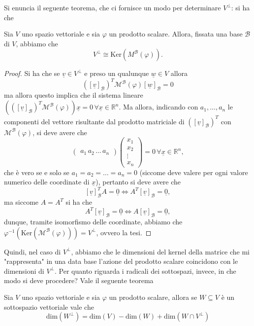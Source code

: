 Si enuncia il seguente teorema, che ci fornisce un modo per determinare $V^\perp$: si ha che
\begin{theorem} \label{thm:rad_V}
	Sia $V$ uno spazio vettoriale e sia $\varphi$ un prodotto scalare. Allora, fissata una base $\mathcal{B}$ di $V$, abbiamo che
	$$
		V^\perp \cong \text{Ker}(M^\mathcal{B}(\varphi)).
	$$
\end{theorem}
\begin{proof}
	Si ha che se $\underline{v} \in V^\perp$ e preso un qualunque $\underline{w} \in V$ allora
	$$
		([\underline{v}]_\mathcal{B})^T \mathcal{M}^\mathcal{B}(\varphi) [\underline{w}]_\mathcal{B} = 0
	$$
	ma allora questo implica che il sistema lineare $(([\underline{v}]_\mathcal{B})^T \mathcal{M}^\mathcal{B}(\varphi))\underline{x} = 0 \, \forall \underline{x} \in \mathbb{R}^n$. Ma allora, indicando con $a_1, \ldots, a_n$ le componenti del vettore risultante dal prodotto matriciale di $([\underline{v}]_\mathcal{B})^T$ con $\mathcal{M}^\mathcal{B}(\varphi)$, si deve avere che
	$$
		\begin{pmatrix} a_1 \, a_2 \, \ldots \, a_n \end{pmatrix} \begin{pmatrix}
			x_1 \\
			x_2 \\
			\vdots \\
			x_n
		\end{pmatrix} = 0 \, \forall \underline{x} \in \mathbb{R}^n,
	$$
	che è vero se e solo se $a_1 = a_2 = \ldots = a_n = 0$ (siccome deve valere per ogni valore numerico delle coordinate di $\underline{x}$), pertanto si deve avere che
	$$
		[\underline{v}]_\mathcal{B}^T A = \underline{0} \iff A^T [\underline{v}]_\mathcal{B} = \underline{0},
	$$
	ma siccome $A = A^T$ si ha che
	$$
		A^T [\underline{v}]_\mathcal{B} = \underline{0} \iff A [\underline{v}]_\mathcal{B} = \underline{0},
	$$
	dunque, tramite isomorfismo delle coordinate, abbiamo che $\varphi^{-1}(\text{Ker}(\mathcal{M}^\mathcal{B}(\varphi))) = V^\perp$, ovvero la tesi.
\end{proof}
Quindi, nel caso di $V^\perp$, abbiamo che le dimensioni del kernel della matrice che mi "rappresenta" in una data base l'azione del prodotto scalare coincidono con le dimensioni di $V^\perp$. Per quanto riguarda i radicali dei sottospazi, invece, in che modo si deve procedere? Vale il seguente teorema
\begin{theorem} \label{thm:rad_ssp}
	Sia $V$ uno spazio vettoriale e sia $\varphi$ un prodotto scalare, allora se $W \subseteq V$ è un sottospazio vettoriale vale che
	$$
		\text{dim}(W^\perp) = \text{dim}(V) - \text{dim}(W) + \text{dim}(W \cap V^\perp)
	$$
\end{theorem}
